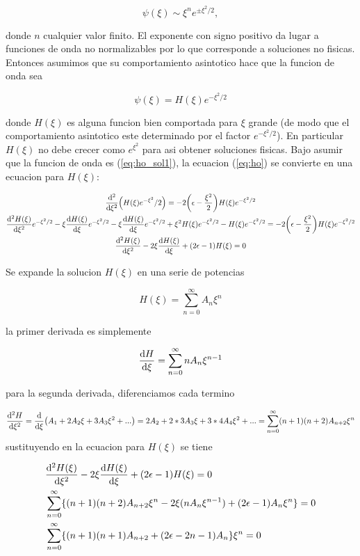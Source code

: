\documentclass[11pt]{article}
\begin{document}
\[ \psi(\xi) \sim \xi^n e^{\pm \xi^2/2}, \]

donde \(n\) cualquier valor finito. El exponente con signo positivo da lugar a funciones de onda no normalizables por lo que corresponde a soluciones no fisicas. Entonces asumimos que su comportamiento asintotico hace que la funcion de onda sea

\begin{equation}
\label{eq:ho_sol1}
\psi(\xi) = H(\xi)e^{-\xi^2/2}
\end{equation}

donde \(H(\xi)\) es alguna funcion bien comportada para \(\xi\) grande (de modo que el comportamiento asintotico este determinado por el factor \(e^{-\xi^2/2}\)). En particular \(H(\xi)\) no debe crecer como \(e^{\xi^2}\) para asi obtener soluciones fisicas. Bajo asumir que la funcion de onda es (\ref{eq:ho_sol1}), la ecuacion (\ref{eq:ho}) se convierte en una ecuacion para \(H(\xi)\):

\begin{gather*}
    \dv[2]{\xi}(H(\xi)e^{-\xi^2}/2) = -2\qty(\epsilon- \frac{\xi^2}{2})H(\xi)e^{-\xi^2/2} \\
    \dv[2]{H(\xi)}{\xi} e^{-\xi^2/2}  -\xi\dv{H(\xi)}{\xi}e^{-\xi^2/2} - \xi\dv{H(\xi)}{\xi}e^{-\xi^2/2} + \xi^2 H(\xi)e^{-\xi^2/2}- H(\xi) e^{-\xi^2/2} = -2\qty(\epsilon- \frac{\xi^2}{2})H(\xi)e^{-\xi^2/2} \\
    \dv[2]{H(\xi)}{\xi} - 2\xi \dv{H(\xi)}{\xi} + (2\epsilon - 1)H(\xi) = 0
\end{gather*}

Se expande la solucion \(H(\xi)\) en una serie de potencias

\[ H(\xi) = \sum_{n=0}^{\infty} A_n\xi^n \]

la primer derivada es simplemente

\[ \dv{H}{\xi} = \sum_{n=0}^{\infty} nA_n\xi^{n-1} \]

para la segunda derivada, diferenciamos cada termino

\[ \dv[2]{H}{\xi} = \dv{\xi}(A_1 + 2A_2\xi + 3A_3 \xi^2 + ... ) = 2A_2 + 2*3 A_3\xi + 3*4 A_4\xi^2 + ... = \sum_{n=0}^{\infty} (n+1)(n+2)A_{n+2} \xi^n \]
sustituyendo en la ecuacion para \(H(\xi)\) se tiene

\begin{align*}
    &\dv[2]{H(\xi)}{\xi} - 2\xi \dv{H(\xi)}{\xi} + (2\epsilon - 1)H(\xi) = 0 \\
    &\sum_{n=0}^{\infty} \{(n+1)(n+2)A_{n+2} \xi^n  - 2\xi(nA_n\xi^{n-1}) + (2\epsilon - 1)A_n\xi^n \}= 0 \\
    &\sum_{n=0}^{\infty}  \{(n+1)(n+1) A_{n+2} + (2\epsilon - 2n - 1)A_n \} \xi^n = 0
\end{align*}
\end{document}
